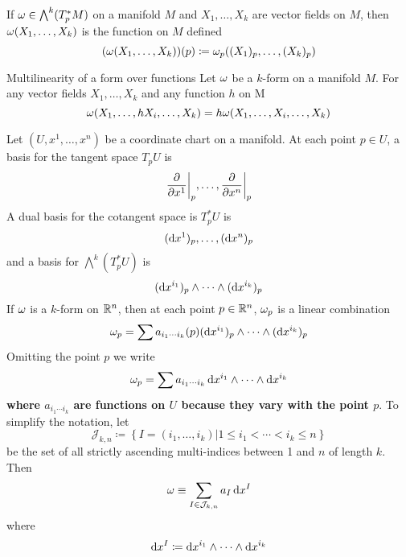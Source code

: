 If \(\omega \in \bigwedge^k(T_p^* M)\) on a manifold \(M\) and \(X_1, \dots, X_k \) are vector fields on \(M\), then \(\omega(X_1, \dots, X_k)\) is the function on \(M\) defined 
\[
    (\omega (X_1, \dots, X_k))(p) \coloneqq \omega_p ((X_1)_p, \dots, (X_k)_p)   
\]
\begin{proposition}{Multilinearity of a form over functions}{}
    Let \(\omega\) be a \(k\)-form on a manifold \(M\). For any vector fields \(X_1, \dots, X_k\) and any function \(h\) on M
    \[
        \omega(X_1, \dots, h X_i, \dots, X_k) = h \omega (X_1, \dots, X_i, \dots, X_k)   
    \]
\end{proposition}
\begin{example}{}{}
    Let \((U, x^1, \dots, x^n)\) be a coordinate chart on a manifold.
    At each point \(p \in U\), a basis for the tangent space \(T_p U\) is 
    \[
        \evalat[\bigg]{\pdv{x^1}}{p}, \dots, \evalat[\bigg]{\pdv{x^n}}{p}
    \]
    A dual basis for the cotangent space is \(T_p^* U\) is 
    \[
       (\dif x^1)_p, \dots, (\dif x^n)_p
    \]
    and a basis for \(\bigwedge^k (T_p^* U)\) is 
    \[
        (\dif x^{i_1})_p \wedge \dots \wedge (\dif x^{i_k})_p     
    \]
    If \(\omega\) is a \(k\)-form on \(\mathbb{R}^n\), then at each point \(p \in \mathbb{R}^n\), \(\omega_p\) is a linear combination 
    \[
        \w_p = \sum a_{i_1 \cdots i_k}(p) (\dif x^{i_1})_p \wedge \dots \wedge (\dif x^{i_k})_p   
    \]
    Omitting the point \(p\) we write 
    \[
        \w_p = \sum a_{i_1 \cdots i_k} \dif x^{i_1} \wedge \dots \wedge \dif x^{i_k}
    \]
    \textbf{where \(a_{i_1 \cdots i_k}\) are functions on \(U\) because they vary with the point \(p\)}.
    To simplify the notation, let 
    \[
        \mathcal{J}_{k,n} \coloneqq \left\{ I = (i_1, \dots, i_k) | 1 \leq i_1 < \cdots < i_k \leq n \right\}
    \]
    be the set of all strictly ascending multi-indices between 1 and \(n\) of length \(k\). 
    Then 
    \[
        \w \equiv \sum_{I\in \mathcal{J}_{k,n}} a_I \dif x^I    
    \]
    where 
    \[
        \dif x^I \coloneqq \dif x^{i_1} \wedge \cdots \wedge \dif x^{i_k}    
    \]
\end{example}

